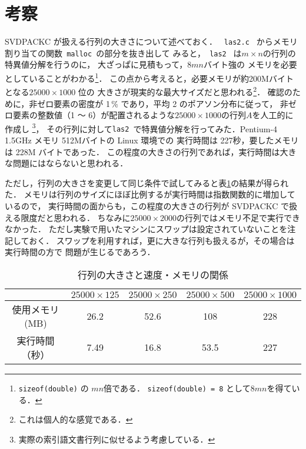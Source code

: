 \section{考察}


SVDPACKC が扱える行列の大きさについて述べておく．
\verb| las2.c | からメモリ割り当ての関数\verb| malloc |の部分を抜き出して
みると，\verb| las2 | は\( m \times n \)の行列の特異値分解を行うのに，
大ざっぱに見積もって，\(  8mn \)バイト強の
メモリを必要としていることがわかる\footnote{{\tt sizeof(double)} の \( mn \)倍である．
{\tt sizeof(double) = 8} として\( 8mn \)を得ている．}．
この点から考えると，必要メモリが約200Mバイトとなる\( 25000 \times 1000 \) 位の
大きさが現実的な最大サイズだと思われる\footnote{これは個人的な感覚である．}．
確認のために，非ゼロ要素の密度が 1\,\% であり，平均 2 のポアソン分布に従って，
非ゼロ要素の整数値（1 〜 6）が配置されるような\( 25000 \times 1000 \)の行列\( A \)を人工的に作成し
\footnote{実際の索引語文書行列に似せるよう考慮している．}，
その行列に対して{\tt las2 }で特異値分解を行ってみた．Pentium-4 1.5GHz メモリ 512Mバイトの Linux 環境での
実行時間は 227秒，要したメモリは 228M バイトであった．
この程度の大きさの行列であれば，実行時間は大きな問題にはならないと思われる．

ただし，行列の大きさを変更して同じ条件で試してみると\mbox{表\ref{sokudo}}の結果が得られた．
メモリは行列のサイズにほぼ比例するが実行時間は指数関数的に増加しているので，
実行時間の面からも，この程度の大きさの行列が SVDPACKC で扱える限度だと思われる．
ちなみに\( 25000 \times 2000 \)の行列ではメモリ不足で実行できなかった．
ただし実験で用いたマシンにスワップは設定されていないことを注記しておく．
スワップを利用すれば，更に大きな行列も扱えるが，その場合は実行時間の方で
問題が生じるであろう．

\begin{table}[htbp]
  \begin{center}
    \leavevmode
    \caption{行列の大きさと速度・メモリの関係}\label{sokudo}
    \begin{tabular}{|c|c|c|c|c|} \hline
                &   \( 25000 \times 125 \) & \( 25000 \times 250 \) & \( 25000 \times 500 \) & \( 25000 \times 1000 \) \\  \hline
使用メモリ(MB)  &    26.2      &    52.6    &    108    &   228      \\
実行時間（秒）  &     7.49     &    16.8    &   53.5    &   227      \\ \hline
    \end{tabular}
  \end{center}
\end{table}

